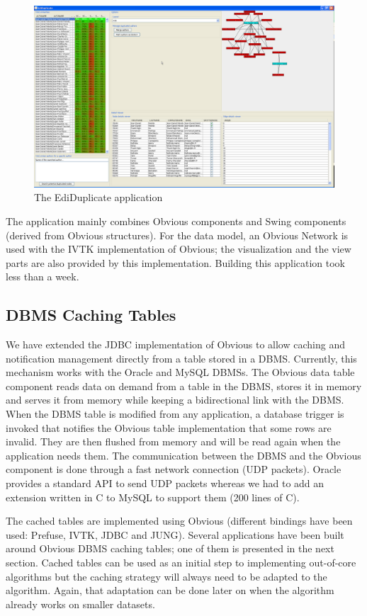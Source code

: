 \begin{figure}[!h]
\centering
\includegraphics[width=0.9\columnwidth]{figures/ediduplicate}
\caption{The EdiDuplicate application}
\label{fig:ediduplicate}
\end{figure}

The application mainly combines Obvious components and Swing
components (derived from Obvious structures). For the data model, an
Obvious Network is used with the IVTK implementation of Obvious; the
visualization and the view parts are also provided by this
implementation.  Building this application took less than a week.

\subsection{DBMS Caching Tables}
\label{dbmscachingtable}

We have extended the JDBC implementation of Obvious to allow caching
and notification management directly from a table stored in a DBMS.
Currently, this mechanism works with the Oracle and MySQL DBMSs.  The
Obvious data table component reads data on demand from a table in the
DBMS, stores it in memory and serves it from memory while keeping a
bidirectional link with the DBMS.  When the DBMS table is modified
from any application, a database trigger is invoked that notifies the
Obvious table implementation that some rows are invalid.  They are
then flushed from memory and will be read again when the application
needs them.  The communication between the DBMS and the Obvious
component is done through a fast network connection (UDP packets).
Oracle provides a standard API to send UDP packets whereas we had to
add an extension written in C to MySQL to support them (200 lines of
C).

The cached tables are implemented using Obvious (different bindings
have been used: Prefuse, IVTK, JDBC and JUNG). Several applications
have been built around Obvious DBMS caching tables; one of them is
presented in the next section.  Cached tables can be used as an
initial step to implementing out-of-core algorithms but the caching
strategy will always need to be adapted to the algorithm.  Again, that
adaptation can be done later on when the algorithm already works on
smaller datasets.


